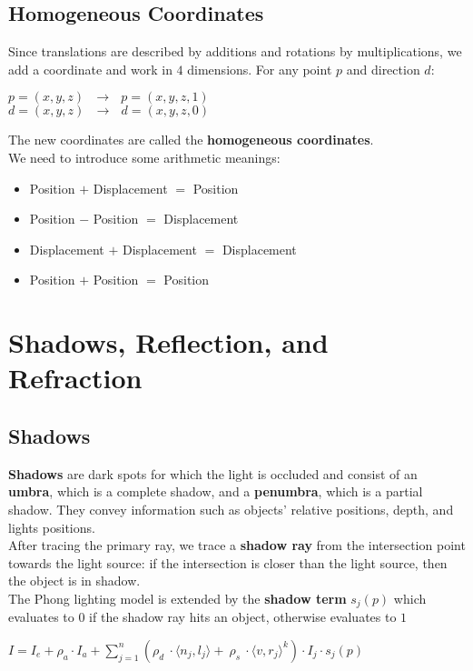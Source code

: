 \documentclass{article}
\begin{document}
\subsection{Homogeneous Coordinates}
Since translations are described by additions and rotations by multiplications, we add a coordinate and work in $4$ dimensions. For any point $p$ and direction $d$:
\begin{center}
    $p = (x,y,z) \ \ \ \rightarrow \ \ \ p = (x,y,z,1)$ \\
    $d = (x,y,z) \ \ \ \rightarrow \ \ \ d = (x,y,z,0)$ 
\end{center}
The new coordinates are called the \textbf{homogeneous coordinates}. \\
We need to introduce some arithmetic meanings:
\begin{itemize}
    \item Position $+$ Displacement $=$ Position
    \item Position $-$ Position $=$ Displacement
    \item Displacement $+$ Displacement $=$ Displacement
    \item Position $+$ Position $=$ Position
\end{itemize}

\newpage

\section{Shadows, Reflection, and Refraction}
\subsection{Shadows}
\textbf{Shadows} are dark spots for which the light is occluded and consist of an \textbf{umbra}, which is a complete shadow, and a \textbf{penumbra}, which is a partial shadow. They convey information such as objects' relative positions, depth, and lights positions. \\
After tracing the primary ray, we trace a \textbf{shadow ray} from the intersection point towards the light source: if the intersection is closer than the light source, then the object is in shadow. \\
The Phong lighting model is extended by the \textbf{shadow term} $s_j(p)$ which evaluates to $0$ if the shadow ray hits an object, otherwise evaluates to $1$
\begin{center}
    $ I = I_e + \rho_a \cdot I_a + \displaystyle\sum^n_{j=1}(\rho_d \ \cdot \langle n_j,l_j\rangle + \ \rho_s \ \cdot \langle v,r_j\rangle^k) \cdot I_j \cdot s_j(p)$
\end{center}
\end{document}
